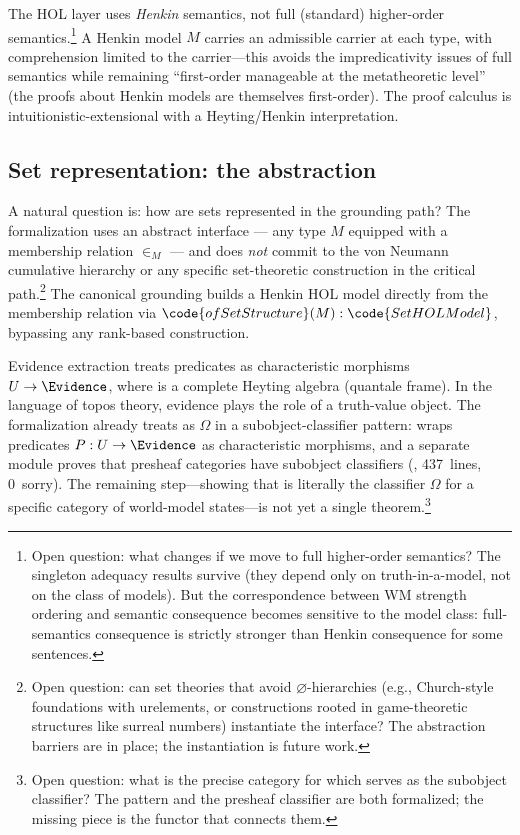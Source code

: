 \documentclass[11pt,openany]{report}
\begin{document}
The HOL layer uses \emph{Henkin} semantics, not full (standard)
higher-order semantics.\footnote{Open question: what changes if we
move to full higher-order semantics?  The singleton adequacy results
survive (they depend only on truth-in-a-model, not on the class of
models).  But the correspondence between WM strength ordering and
semantic consequence becomes sensitive to the model class:
full-semantics consequence is strictly stronger than Henkin
consequence for some sentences.}  A Henkin model $M$ carries an
admissible carrier at each type, with comprehension limited to the
carrier---this avoids the impredicativity issues of full semantics
while remaining ``first-order manageable at the metatheoretic level''
(the proofs about Henkin models are themselves first-order).  The
proof calculus is intuitionistic-extensional with a Heyting/Henkin
interpretation.

\subsection{Set representation: the  abstraction}

A natural question is: how are sets represented in the grounding
path?  The formalization uses an abstract  interface
--- any type $M$ equipped with a membership relation $\in_M$ ---
and does \emph{not} commit to the von Neumann cumulative hierarchy
or any specific set-theoretic construction in the critical
path.\footnote{Open question: can set theories that avoid
$\varnothing$-hierarchies (e.g., Church-style foundations with
urelements, or constructions rooted in game-theoretic structures
like surreal numbers) instantiate the  interface?
The abstraction barriers are in place; the instantiation is future
work.}  The canonical grounding builds a Henkin HOL model directly
from the membership relation via
$\code{ofSetStructure}(M) : \code{SetHOLModel}$,
bypassing any rank-based construction.

Evidence extraction treats predicates as characteristic morphisms
$U \to \Evidence$, where \Evidence{} is a complete Heyting algebra
(quantale frame).  In the language of topos theory, evidence plays
the role of a truth-value
object.  The formalization already treats \Evidence{} as
$\Omega$ in a subobject-classifier pattern: 
wraps predicates $P : U \to \Evidence$ as characteristic morphisms,
and a separate module proves that presheaf categories have subobject
classifiers (, 437~lines,
0~sorry).  The remaining step---showing that \Evidence{} is literally
the classifier $\Omega$ for a specific category of world-model
states---is not yet a single
theorem.\footnote{Open question: what is the precise category for
which \Evidence{} serves as the subobject classifier?  The
 pattern and the presheaf classifier are
both formalized; the missing piece is the functor that connects
them.}
\end{document}

